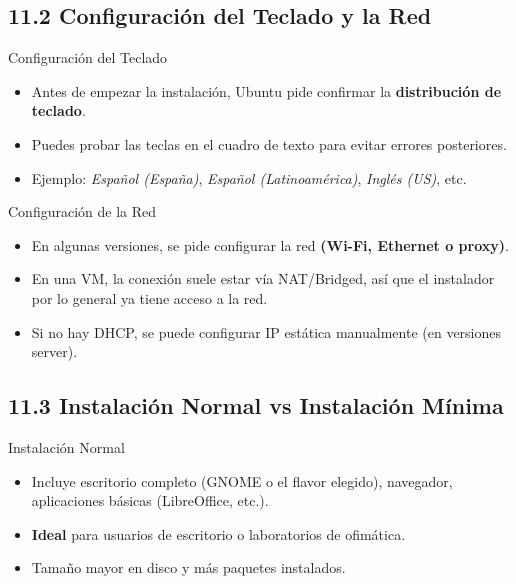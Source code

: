 \documentclass{beamer}
\begin{document}
\subsection{11.2 Configuración del Teclado y la Red}
\begin{frame}{Configuración del Teclado}
    \begin{itemize}
        \item Antes de empezar la instalación, Ubuntu pide confirmar la \textbf{distribución de teclado}.
        \item Puedes probar las teclas en el cuadro de texto para evitar errores posteriores.
        \item Ejemplo: \textit{Español (España)}, \textit{Español (Latinoamérica)}, \textit{Inglés (US)}, etc.
    \end{itemize}
\end{frame}

\begin{frame}{Configuración de la Red}
    \begin{itemize}
        \item En algunas versiones, se pide configurar la red \textbf{(Wi-Fi, Ethernet o proxy)}.
        \item En una VM, la conexión suele estar vía NAT/Bridged, así que el instalador por lo general ya tiene acceso a la red.
        \item Si no hay DHCP, se puede configurar IP estática manualmente (en versiones server).
    \end{itemize}
\end{frame}

\subsection{11.3 Instalación Normal vs Instalación Mínima}
\begin{frame}{Instalación Normal}
    \begin{itemize}
        \item Incluye escritorio completo (GNOME o el flavor elegido), navegador, aplicaciones básicas (LibreOffice, etc.).
        \item \textbf{Ideal} para usuarios de escritorio o laboratorios de ofimática.
        \item Tamaño mayor en disco y más paquetes instalados.
    \end{itemize}
\end{frame}
\end{document}

